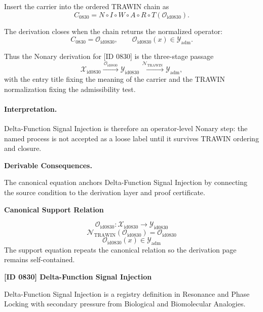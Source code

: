Insert the carrier into the ordered TRAWIN chain as\[
C_{0830}=N\circ I\circ W\circ A\circ R\circ T(\mathcal{O}_{\mathrm{id0830}}).
\]

The derivation closes when the chain returns the normalized operator:\[
C_{0830}=\mathcal{O}_{\mathrm{id0830}},\qquad \mathcal{O}_{\mathrm{id0830}}(x)\in\mathcal{Y}_{\mathrm{adm}}.
\]

Thus the Nonary derivation for [ID 0830] is the three-stage passage
\[
\mathcal{X}_{\mathrm{id0830}}\xrightarrow{\,\mathcal{O}_{\mathrm{id0830}}\,} \mathcal{Y}_{\mathrm{id0830}}\xrightarrow{\,\mathcal{N}_{\mathrm{TRAWIN}}\,} \mathcal{Y}_{\mathrm{adm}},
\]
with the entry title fixing the meaning of the carrier and the TRAWIN normalization fixing the admissibility test.

\paragraph{Interpretation.} Delta-Function Signal Injection is therefore an operator-level Nonary step: the named process is not accepted as a loose label until it survives TRAWIN ordering and closure.

\par\vspace{0.35em}
\noindent\textbf{Derivable Consequences.}\quad
\begingroup
\footnotesize
\raggedright
The canonical equation anchors Delta-Function Signal Injection by connecting the source condition to the derivation layer and proof certificate.
\par\endgroup

\noindent\textbf{Canonical Support Relation}\par
\[
\mathcal{O}_{\mathrm{id0830}}:\mathcal{X}_{\mathrm{id0830}}\longrightarrow\mathcal{Y}_{\mathrm{id0830}}
\]
\[
\mathcal{N}_{\mathrm{TRAWIN}}(\mathcal{O}_{\mathrm{id0830}})=\mathcal{O}_{\mathrm{id0830}}
\]
\[
\mathcal{O}_{\mathrm{id0830}}(x)\in\mathcal{Y}_{\mathrm{adm}}
\]
\noindent The support equation repeats the canonical relation so the derivation page remains self-contained.\par

\clearpage
\noindent\textbf{[ID 0830] Delta-Function Signal Injection}\par
\vspace{0.35em}
\begingroup\small
{}
Delta-Function Signal Injection is a registry definition in Resonance and Phase Locking with secondary pressure from Biological and Biomolecular Analogies.

